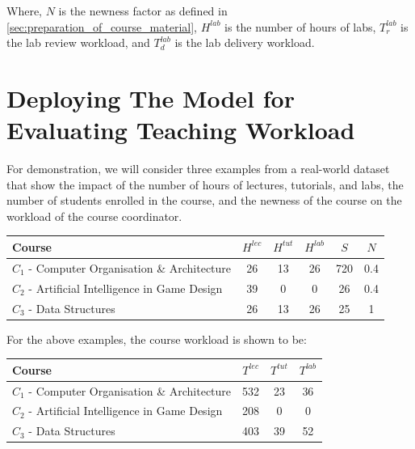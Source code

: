 Where, \(N\) is the newness factor as defined in \autoref{sec:preparation_of_course_material}, \(H^{lab}\) is the number of hours of labs, \(T_r^{lab}\) is the lab review workload, and \(T_d^{lab}\) is the lab delivery workload.

\section{Deploying The Model for Evaluating Teaching Workload}
\label{sec:workload_demo}

For demonstration, we will consider three examples from a real-world dataset that show the impact of the number of hours of lectures, tutorials, and labs, the number of students enrolled in the course, and the newness of the course on the workload of the course coordinator.

\begin{table}[H]
  \centering
  \begin{tabular}{|l|c|c|c|c|c|}
    \hline
    \textbf{Course}                                  & \(H^{lec}\) & \(H^{tut}\) & \(H^{lab}\) & \(S\) & \(N\) \\\hline
    \(C_1\) - Computer Organisation \& Architecture  & 26          & 13          & 26          & 720   & 0.4   \\\hline
    \(C_2\) - Artificial Intelligence in Game Design & 39          & 0           & 0           & 26    & 0.4   \\\hline
    \(C_3\) - Data Structures                        & 26          & 13          & 26          & 25    & 1     \\\hline
  \end{tabular}
\end{table}

For the above examples, the course workload is shown to be:

\begin{table}[H]
  \centering
  \begin{tabular}{|l|c|c|c|}
    \hline
    \textbf{Course}                                  & \(T^{lec}\) & \(T^{tut}\) & \(T^{lab}\) \\\hline
    \(C_1\) - Computer Organisation \& Architecture  & 532         & 23          & 36          \\\hline
    \(C_2\) - Artificial Intelligence in Game Design & 208         & 0           & 0           \\\hline
    \(C_3\) - Data Structures                        & 403         & 39          & 52          \\\hline
  \end{tabular}
\end{table}

